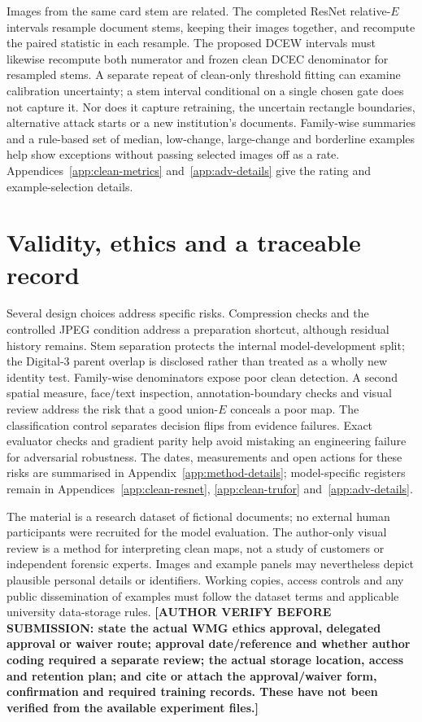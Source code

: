 Images from the same card stem are related. The completed ResNet relative-$E$ intervals resample document stems, keeping their images together, and recompute the paired statistic in each resample. The proposed DCEW intervals must likewise recompute both numerator and frozen clean DCEC denominator for resampled stems. A separate repeat of clean-only threshold fitting can examine calibration uncertainty; a stem interval conditional on a single chosen gate does not capture it. Nor does it capture retraining, the uncertain rectangle boundaries, alternative attack starts or a new institution's documents. Family-wise summaries and a rule-based set of median, low-change, large-change and borderline examples help show exceptions without passing selected images off as a rate. Appendices~\ref{app:clean-metrics} and~\ref{app:adv-details} give the rating and example-selection details.

\section{Validity, ethics and a traceable record}
\label{sec:method-validity}

Several design choices address specific risks. Compression checks and the controlled JPEG condition address a preparation shortcut, although residual history remains. Stem separation protects the internal model-development split; the Digital-3 parent overlap is disclosed rather than treated as a wholly new identity test. Family-wise denominators expose poor clean detection. A second spatial measure, face/text inspection, annotation-boundary checks and visual review address the risk that a good union-$E$ conceals a poor map. The classification control separates decision flips from evidence failures. Exact evaluator checks and gradient parity help avoid mistaking an engineering failure for adversarial robustness. The dates, measurements and open actions for these risks are summarised in Appendix~\ref{app:method-details}; model-specific registers remain in Appendices~\ref{app:clean-resnet}, \ref{app:clean-trufor} and~\ref{app:adv-details}.

The material is a research dataset of fictional documents; no external human participants were recruited for the model evaluation. The author-only visual review is a method for interpreting clean maps, not a study of customers or independent forensic experts. Images and example panels may nevertheless depict plausible personal details or identifiers. Working copies, access controls and any public dissemination of examples must follow the dataset terms and applicable university data-storage rules. \textbf{[AUTHOR VERIFY BEFORE SUBMISSION: state the actual WMG ethics approval, delegated approval or waiver route; approval date/reference and whether author coding required a separate review; the actual storage location, access and retention plan; and cite or attach the approval/waiver form, confirmation and required training records. These have not been verified from the available experiment files.]}

